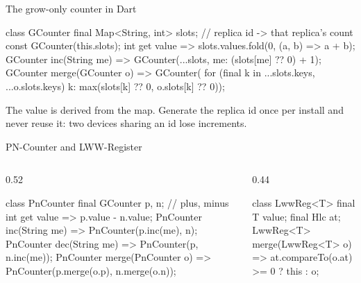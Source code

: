 \documentclass[10pt,aspectratio=169,t]{beamer}
\begin{document}
\begin{frame}[fragile,eyebrow=CRDTs]{The grow-only counter in Dart}
\begin{dart}
class GCounter {
  final Map<String, int> slots;     // replica id -> that replica's count
  const GCounter(this.slots);
  int get value => slots.values.fold(0, (a, b) => a + b);
  GCounter inc(String me) => GCounter({...slots, me: (slots[me] ?? 0) + 1});
  GCounter merge(GCounter o) => GCounter({
      for (final k in {...slots.keys, ...o.slots.keys})
        k: max(slots[k] ?? 0, o.slots[k] ?? 0)});
}
\end{dart}
  \begin{takeaway}{The value is derived from the map.}
    Generate the replica id once per install and never reuse it: two devices sharing an id lose increments.
  \end{takeaway}
\end{frame}

\begin{frame}[fragile,eyebrow=CRDTs]{PN-Counter and LWW-Register}
  \begin{columns}[T]
    \begin{column}{0.52\textwidth}
\begin{dart}
class PnCounter {
  final GCounter p, n;  // plus, minus
  int get value => p.value - n.value;
  PnCounter inc(String me) =>
      PnCounter(p.inc(me), n);
  PnCounter dec(String me) =>
      PnCounter(p, n.inc(me));
  PnCounter merge(PnCounter o) =>
      PnCounter(p.merge(o.p),
          n.merge(o.n));
}
\end{dart}
    \end{column}
    \begin{column}{0.44\textwidth}
\begin{dart}
class LwwReg<T> {
  final T value;
  final Hlc at;
  LwwReg<T> merge(LwwReg<T> o) =>
      at.compareTo(o.at) >= 0
          ? this : o;
}
\end{dart}
    \end{column}
  \end{columns}
\end{frame}
\end{document}
